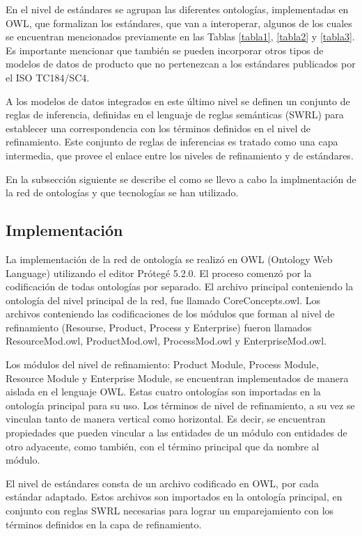 \documentclass[journal]{IEEEtran}
\begin{document}
En el nivel de est\'andares se agrupan las diferentes ontolog\'ias, implementadas en OWL, que formalizan los est\'andares, que van a interoperar, algunos de los cuales se encuentran mencionados previamente en las Tablas \ref{tabla1}, \ref{tabla2} y \ref{tabla3}. Es importante mencionar que tambi\'en se pueden incorporar otros tipos de modelos de datos de producto que no pertenezcan a los est\'andares publicados por el ISO TC184/SC4.  

A los modelos de datos integrados en este \'ultimo nivel se definen un conjunto de reglas de inferencia, definidas en el lenguaje de reglas sem\'anticas (SWRL) para establecer una correspondencia con los t\'erminos definidos en el nivel de refinamiento. Este conjunto de reglas de inferencias es tratado como una capa intermedia, que provee el enlace entre los niveles de refinamiento y de est\'andares. 


En la subsecci\'on siguiente se describe el como se llevo a cabo la implmentaci\'on de la red de ontolog\'ias y que tecnolog\'ias se han utilizado.

\subsection{Implementaci\'on}

La implementaci\'on de la red de ontolog\'ia se realiz\'o en OWL (Ontology Web Language) utilizando el editor Pr\'oteg\'e 5.2.0. El proceso comenz\'o por la codificaci\'on de todas ontolog\'ias por separado. El archivo principal conteniendo la ontolog\'ia del nivel principal de la red, fue llamado CoreConcepts.owl. Los archivos conteniendo las codificaciones de los m\'odulos que forman al nivel de refinamiento (Resourse, Product, Process y Enterprise) fueron llamados ResourceMod.owl, ProductMod.owl, ProcessMod.owl y EnterpriseMod.owl. 

Los m\'odulos del nivel de refinamiento: Product Module, Process Module, Resource Module y Enterprise Module, se encuentran implementados de manera aislada en el lenguaje OWL. Estas cuatro ontolog\'ias son importadas en la ontolog\'ia   principal para su uso. Los t\'erminos de nivel de refinamiento, a su vez se vinculan tanto de manera vertical como horizontal. Es decir, se encuentran propiedades que pueden vincular a las entidades de un m\'odulo con entidades de otro adyacente, como tambi\'en, con el t\'ermino principal que da nombre al m\'odulo. 

El nivel de est\'andares consta de un archivo codificado en OWL, por cada est\'andar adaptado. Estos archivos son importados en la ontolog\'ia principal, en conjunto con reglas SWRL necesarias para lograr un emparejamiento con los t\'erminos definidos en la capa de refinamiento.
\end{document}
